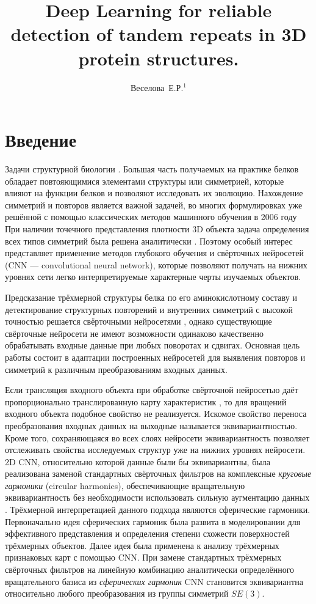 \documentclass[12pt,twosides]{article}
\title
[Detection of tandem repeats in proteins]
{Deep Learning for reliable detection of tandem repeats in 3D protein structures.}
\author
[Веселова~Е.Р.] 
{Веселова~Е.Р.$^1$}
\begin{document}
	\maketitle
	
	\section{Введение}
	Задачи структурной биологии . Большая часть получаемых на практике белков обладает повтояющимися элементами структуры или симметрией, которые влияют на функции белков и позволяют исследовать их эволюцию. Нахождение симметрий и повторов является важной задачей, во многих формулировках уже решённой с помощью классических методов машинного обучения в 2006 году \cite{MitGuiPau06}
	При наличии точечного представления плотности 3D объекта задача определения всех типов симметрий была решена аналитически \cite{pages:hal-01779893, pages:hal-01816449}.
	Поэтому особый интерес представляет применение методов глубокого обучения и свёрточных нейросетей (CNN --- convolutional neural network), которые позволяют получать на нижних уровнях сети легко интерпретируемые характерные черты изучаемых объектов. 
	
	Предсказание трёхмерной структуры белка по его аминокислотному составу \cite{BioCNN18} и детектирование структурных повторений и внутренних симметрий с высокой точностью решается свёрточными нейросетями \cite{DeepSymmetry18}, однако существующие свёрточные нейросети не имеют возможности одинаково качественно обрабатывать входные данные при любых поворотах и сдвигах. Основная цель работы состоит в адаптации построенных нейросетей для выявления повторов и симметрий к различным преобразованиям входных данных. 
	
	Если трансляция входного объекта при обработке свёрточной нейросетью даёт пропорционально транслированную карту характеристик \cite{Lenc18}, то для вращений входного объекта подобное свойство не реализуется. Искомое свойство переноса преобразования входных данных на выходные называется эквивариантностью. Кроме того, сохраняющаяся во всех слоях нейросети эквивариантность позволяет отслеживать свойства исследуемых структур уже на нижних уровнях нейросети. 2D CNN, относительно которой данные были бы эквивариантны, была реализована заменой стандартных свёрточных фильтров на комплексные \textit{круговые гармоники} (circular harmonics), обеспечивающие вращательную эквивариантность без необходимости использовать сильную аугментацию данных \cite{conf/cvpr/WorrallGTB17}. Трёхмерной интерпретацией данного подхода являются сферические гармоники. Первоначально идея сферических гармоник была развита в моделировании для эффективного представления и определения степени схожести поверхностей трёхмерных объектов\cite{conf/siggraph/KazhdanF02, journals/cagd/MousaCAG08}. Далее идея была применена к анализу трёхмерных признаковых карт с помощью CNN. При замене стандартных трёхмерных свёрточных фильтров на линейную комбинацию аналитически определённого вращательного базиса из \textit{сферических гармоник} CNN становится эквивариантна относительно любого преобразования из группы симметрий $SE(3)$\cite{DBLP:journals/corr/abs-1807-02547}.
	
\end{document}
